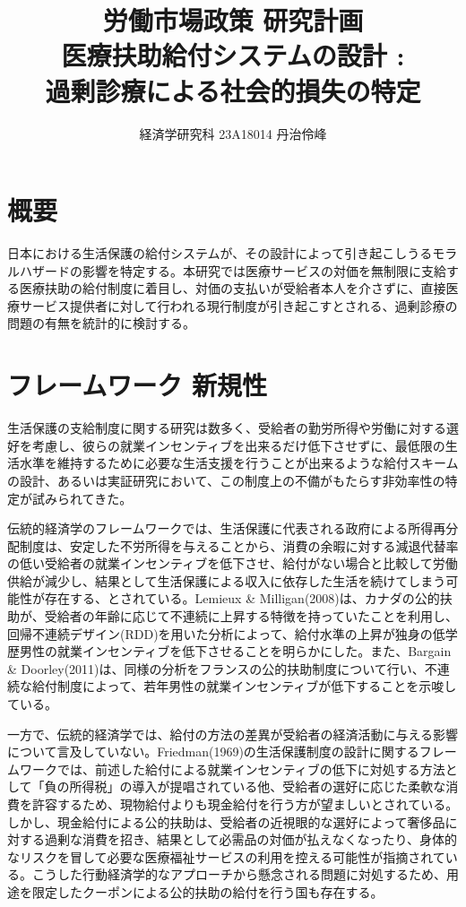 \documentclass{jsarticle}[12pt]
\begin{document}
\title{労働市場政策 研究計画 \\
医療扶助給付システムの設計 : \\ 過剰診療による社会的損失の特定}
\author{経済学研究科 23A18014 丹治伶峰}
\date{}
\maketitle

\large

\section{概要}

日本における生活保護の給付システムが、その設計によって引き起こしうるモラルハザードの影響を特定する。本研究では医療サービスの対価を無制限に支給する医療扶助の給付制度に着目し、対価の支払いが受給者本人を介さずに、直接医療サービス提供者に対して行われる現行制度が引き起こすとされる、過剰診療の問題の有無を統計的に検討する。

\section{フレームワーク 新規性}

生活保護の支給制度に関する研究は数多く、受給者の勤労所得や労働に対する選好を考慮し、彼らの就業インセンティブを出来るだけ低下させずに、最低限の生活水準を維持するために必要な生活支援を行うことが出来るような給付スキームの設計、あるいは実証研究において、この制度上の不備がもたらす非効率性の特定が試みられてきた。

伝統的経済学のフレームワークでは、生活保護に代表される政府による所得再分配制度は、安定した不労所得を与えることから、消費の余暇に対する減退代替率の低い受給者の就業インセンティブを低下させ、給付がない場合と比較して労働供給が減少し、結果として生活保護による収入に依存した生活を続けてしまう可能性が存在する、とされている。Lemieux \& Milligan(2008)は、カナダの公的扶助が、受給者の年齢に応じて不連続に上昇する特徴を持っていたことを利用し、回帰不連続デザイン(RDD)を用いた分析によって、給付水準の上昇が独身の低学歴男性の就業インセンティブを低下させることを明らかにした。また、Bargain \& Doorley(2011)は、同様の分析をフランスの公的扶助制度について行い、不連続な給付制度によって、若年男性の就業インセンティブが低下することを示唆している。

一方で、伝統的経済学では、給付の方法の差異が受給者の経済活動に与える影響について言及していない。Friedman(1969)の生活保護制度の設計に関するフレームワークでは、前述した給付による就業インセンティブの低下に対処する方法として「負の所得税」の導入が提唱されている他、受給者の選好に応じた柔軟な消費を許容するため、現物給付よりも現金給付を行う方が望ましいとされている。しかし、現金給付による公的扶助は、受給者の近視眼的な選好によって奢侈品に対する過剰な消費を招き、結果として必需品の対価が払えなくなったり、身体的なリスクを冒して必要な医療福祉サービスの利用を控える可能性が指摘されている。こうした行動経済学的なアプローチから懸念される問題に対処するため、用途を限定したクーポンによる公的扶助の給付を行う国も存在する。
\end{document}
